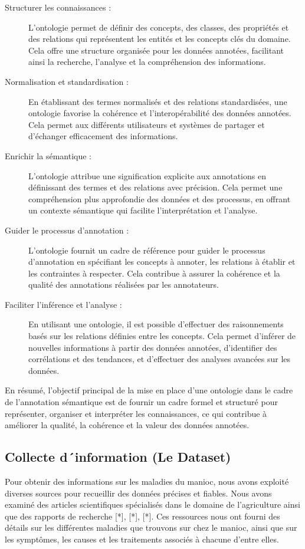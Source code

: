 \begin{description}
	\item[Structurer les connaissances : ]L'ontologie permet de définir des concepts, des classes, des propriétés et des relations qui représentent les entités et les concepts clés du domaine. Cela offre une structure organisée pour les données annotées, facilitant ainsi la recherche, l'analyse et la compréhension des informations.
	
	\item[Normalisation et standardisation : ]En établissant des termes normalisés et des relations standardisées, une ontologie favorise la cohérence et l'interopérabilité des données annotées. Cela permet aux différents utilisateurs et systèmes de partager et d'échanger efficacement des informations.
	
	\item[Enrichir la sémantique :] L'ontologie attribue une signification explicite aux annotations en définissant des termes et des relations avec précision. Cela permet une compréhension plus approfondie des données et des processus, en offrant un contexte sémantique qui facilite l'interprétation et l'analyse.
	
	\item[Guider le processus d'annotation : ]L'ontologie fournit un cadre de référence pour guider le processus d'annotation en spécifiant les concepts à annoter, les relations à établir et les contraintes à respecter. Cela contribue à assurer la cohérence et la qualité des annotations réalisées par les annotateurs.
	
	\item[Faciliter l'inférence et l'analyse :]En utilisant une ontologie, il est possible d'effectuer des raisonnements basés sur les relations définies entre les concepts. Cela permet d'inférer de nouvelles informations à partir des données annotées, d'identifier des corrélations et des tendances, et d'effectuer des analyses avancées sur les données.
	
	
\end{description}

En résumé, l'objectif principal de la mise en place d'une ontologie dans le cadre de l'annotation sémantique est de fournir un cadre formel et structuré pour représenter, organiser et interpréter les connaissances, ce qui contribue à améliorer la qualité, la cohérence et la valeur des données annotées. \\


\subsection{Collecte d´information (Le Dataset)}
Pour obtenir des informations sur les maladies du manioc, nous avons exploité diverses sources pour recueillir des données précises et fiables. Nous avons examiné des articles scientifiques spécialisés dans le domaine de l'agriculture ainsi que des rapports de recherche [*], [*], [*]. Ces ressources nous ont fourni des détails sur les différentes maladies que trouvons sur chez le manioc, ainsi que sur les symptômes, les causes et les traitements associés à chacune d'entre elles.

